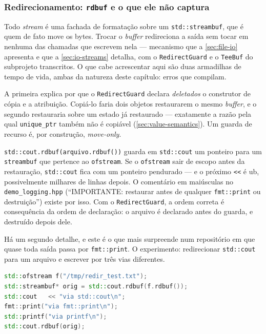 \subsubsection{Redirecionamento: \texttt{rdbuf} e o que ele não captura}

Todo \emph{stream} é uma fachada de formatação sobre um \texttt{std::streambuf},
que é quem de fato move os bytes. Trocar o \emph{buffer} redireciona a saída sem
tocar em nenhuma das chamadas que escrevem nela --- mecanismo que a
\cref{sec:file-io} apresenta e que a \cref{sec:io-streams} detalha, com o
\texttt{RedirectGuard} e o \texttt{TeeBuf} do subprojeto transcritos. O que cabe
acrescentar aqui são duas armadilhas de tempo de vida, ambas da natureza deste
capítulo: erros que compilam.

A primeira explica por que o \texttt{RedirectGuard} declara \emph{deletados} o
construtor de cópia e a atribuição. Copiá-lo faria dois objetos restaurarem o
mesmo \emph{buffer}, e o segundo restauraria sobre um estado já restaurado ---
exatamente a razão pela qual \texttt{unique\_ptr} também não é copiável
(\cref{sec:value-semantics}). Um guarda de recurso é, por construção,
\emph{move-only}.

\begin{armadilha}
\texttt{std::cout.rdbuf(arquivo.rdbuf())} guarda em \texttt{std::cout} um
ponteiro para um \texttt{streambuf} que pertence ao \texttt{ofstream}. Se o
\texttt{ofstream} sair de escopo antes da restauração, \texttt{std::cout} fica
com um ponteiro pendurado --- e o próximo \texttt{<<} é \gls{ub}, possivelmente
milhares de linhas depois. O comentário em maiúsculas no
\texttt{demo\_logging.hpp} (``IMPORTANTE: restaurar antes de qualquer
\texttt{fmt::print} ou destruição'') existe por isso. Com o
\texttt{RedirectGuard}, a ordem correta é consequência da ordem de declaração:
o arquivo é declarado antes do guarda, e destruído depois dele.
\end{armadilha}

Há um segundo detalhe, e este é o que mais surpreende num repositório em que
quase toda saída passa por \texttt{fmt::print}. O experimento: redirecionar
\texttt{std::cout} para um arquivo e escrever por três vias diferentes.

\begin{lstlisting}[style=bt, language=C++,
    caption={O experimento --- três escritas, um redirecionamento.}]
std::ofstream f("/tmp/redir_test.txt");
std::streambuf* orig = std::cout.rdbuf(f.rdbuf());
std::cout   << "via std::cout\n";
fmt::print("via fmt::print\n");
std::printf("via printf\n");
std::cout.rdbuf(orig);
\end{lstlisting}

